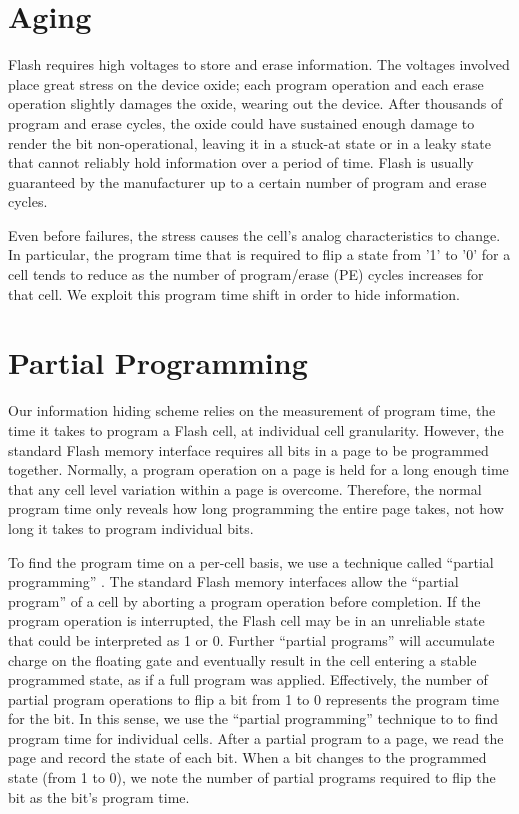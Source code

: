 \section{Aging} 

Flash requires high voltages to store and erase information.
The voltages involved place great stress on the device oxide;
each program operation and each erase operation slightly damages the oxide,
wearing out the device.
After thousands of program and erase cycles, the oxide could
have sustained enough damage to render the bit non-operational, leaving
it in a stuck-at state or in a leaky state that cannot reliably 
hold information over a period of time. Flash is usually
guaranteed by the manufacturer up to a certain number of program
and erase cycles. 

Even before failures, the stress causes
the cell's analog characteristics to change. In particular, the
program time that is required to flip a state from '1' to '0' for
a cell tends to reduce as the number of program/erase (PE) cycles increases
for that cell. We exploit this program time shift in order to
hide information.



\section{Partial Programming}

Our information hiding scheme relies on the measurement of program
time, the time it takes to program a Flash cell, at individual cell
granularity. However, the standard Flash memory interface
requires all bits in a page to be programmed together. 
Normally, a program operation on a page is held for a long enough time 
that any cell level variation within a page is overcome. 
Therefore, the normal program time only reveals how long programming
the entire page takes, not how long it takes to program individual bits.

To find the program time on a per-cell basis, we use
a technique called ``partial programming'' \cite{flash-ieeesp2012}.
The standard Flash memory interfaces allow the ``partial program'' 
of a cell by aborting a program operation before completion. 
If the program
operation is interrupted, the Flash cell may be in an unreliable
state that could be interpreted as 1 or 0. Further ``partial
programs'' will accumulate charge on the floating gate and
eventually result in the cell entering a stable programmed
state, as if a full program was applied. Effectively, the number of
partial program operations to flip a bit from 1 to 0 represents
the program time for the bit.
In this sense, we use the ``partial programming'' technique to 
to find program time for individual cells. After a partial program to a
page, we read the page and record the state of each bit. When a
bit changes to the programmed state (from 1 to 0), we
note the number of partial programs required to flip the bit as 
the bit's program time.

